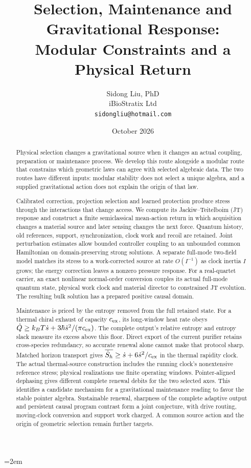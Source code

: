 \documentclass[12pt,a4paper]{article}
\title{Selection, Maintenance and Gravitational Response:\\
Modular Constraints and a Physical Return}
\author{
  Sidong Liu, PhD \\
  iBioStratix Ltd \\
  \texttt{sidongliu@hotmail.com}
}
\date{October 2026}
\begin{document}
\emergencystretch=2em
\raggedbottom
{}

\maketitle


\begin{abstract}
Physical selection changes a gravitational source when it changes an actual
coupling, preparation or maintenance process. We develop this route alongside
a modular route that constrains which geometric laws can agree with selected
algebraic data. The two routes have different inputs: modular stability does
not select a unique algebra, and a supplied gravitational action does not
explain the origin of that law.

Calibrated correction, projection selection and learned protection produce
stress through the interactions that change access. We compute its
Jackiw--Teitelboim (JT) response and construct a finite semiclassical
mean-action return in which
acquisition changes a material source and later sensing changes the next
force. Quantum history, old references, support, synchronization, clock
work and recoil are retained. Joint perturbation estimates allow bounded controller coupling to
an unbounded common Hamiltonian on domain-preserving strong solutions. A separate full-mode two-field model
matches its stress to a work-corrected source at rate $O(I^{-1})$ as
clock inertia $I$ grows; the energy correction leaves a nonzero pressure
response. For a real-quartet carrier, an exact nonlinear normal-order
conversion couples its actual full-mode quantum state, physical work
clock and material director to constrained JT evolution. The resulting
bulk solution has a prepared positive causal domain.

Maintenance is priced by the entropy removed from the full retained state.
For a thermal chiral exhaust of capacity $c_{\rm ex}$, its long-window heat
rate obeys $\dot Q\ge k_BT\dot s+3\hbar\dot s^2/(\pi c_{\rm ex})$.
The complete output's relative entropy and entropy slack measure its
excess above this floor. Direct export of the current purifier retains
cross-species redundancy, so accurate renewal alone cannot make that
protocol sharp.
Matched horizon transport gives $\overline{\dot S_h}\ge
\dot s+6\dot s^2/c_{\rm ex}$ in the thermal rapidity clock.
The actual thermal-source construction includes the running clock's
nonextensive reference stress; physical realizations use finite operating
windows. Pointer-aligned dephasing gives different complete renewal debits
for the two selected axes. This identifies a candidate mechanism for a gravitational
maintenance reading to favor the stable pointer algebra. Sustainable
renewal, sharpness of the complete adaptive output and persistent causal
program contrast form a joint conjecture, with drive routing, moving-clock
conversion and support work charged. A common source action and the
origin of geometric selection remain further targets.
\end{abstract}
\end{document}
